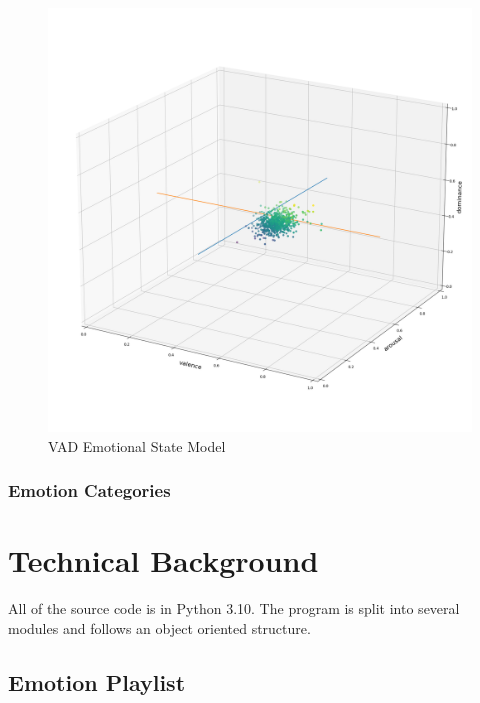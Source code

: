 \documentclass[11pt]{article}
\begin{document}
\begin{figure}[!ht]
  \includegraphics[scale=0.35]{../statics/vad.png}
  \centering
  \caption{VAD Emotional State Model}
  \label{fig:va}
\end{figure}

\subsubsection{Emotion Categories}


\section{Technical Background}
All of the source code is in Python 3.10. The program is split into several modules and follows an object oriented structure.





\subsection{Emotion Playlist}
\end{document}

